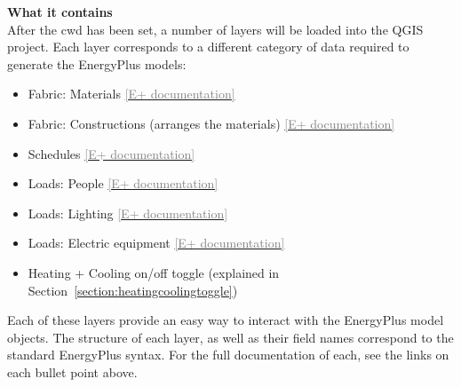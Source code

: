 \documentclass{article}
\begin{document}
\textbf{What it contains} \\
After the cwd has been set, a number of layers will be loaded into the QGIS project. Each layer corresponds to a different category of data required to generate the EnergyPlus models:
\begin{itemize}
    \item Fabric: Materials 
    \hspace{5mm}\href{https://bigladdersoftware.com/epx/docs/8-9/input-output-reference/group-surface-construction-elements.html#material}{\small{\textcolor{gray}{[E+ documentation]}}}
    \item Fabric: Constructions (arranges the materials)
    \hspace{5mm}\href{https://bigladdersoftware.com/epx/docs/8-9/input-output-reference/group-surface-construction-elements.html#construction-000}{\small{\textcolor{gray}{[E+ documentation]}}}
    \item Schedules
    \hspace{5mm}\href{https://bigladdersoftware.com/epx/docs/8-9/input-output-reference/group-schedules.html#schedulecompact}{\small{\textcolor{gray}{[E+ documentation]}}}
    \item Loads: People
    \hspace{5mm}\href{https://bigladdersoftware.com/epx/docs/8-9/input-output-reference/group-internal-gains-people-lights-other.html#people}{\small{\textcolor{gray}{[E+ documentation]}}}
    \item Loads: Lighting
    \hspace{5mm}\href{https://bigladdersoftware.com/epx/docs/8-9/input-output-reference/group-internal-gains-people-lights-other.html#lights-000}{\small{\textcolor{gray}{[E+ documentation]}}}
    \item Loads: Electric equipment
    \hspace{5mm}\href{https://bigladdersoftware.com/epx/docs/8-9/input-output-reference/group-internal-gains-people-lights-other.html#electricequipment}{\small{\textcolor{gray}{[E+ documentation]}}}
    \item Heating + Cooling on/off toggle (explained in Section~\ref{section:heatingcoolingtoggle})
\end{itemize}
Each of these layers provide an easy way to interact with the EnergyPlus model objects. The structure of each layer, as well as their field names correspond to the standard EnergyPlus syntax. For the full documentation of each, see the links on each bullet point above. \\
\end{document}
